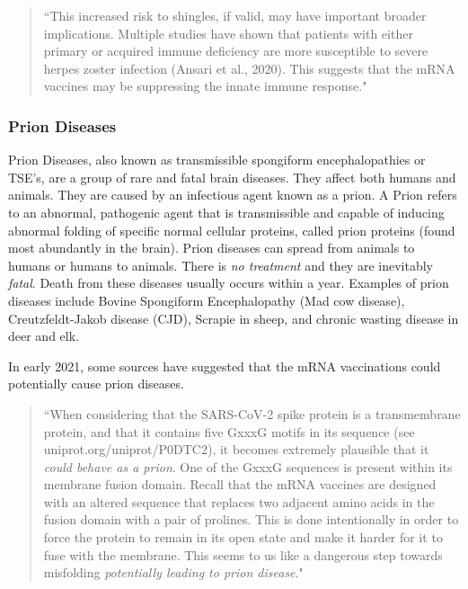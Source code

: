 \documentclass[10pt, a4paper, twocolumn]{book}
\begin{document}
\begin{quotation}
	``This increased risk to shingles, if valid, may have important broader implications. Multiple studies
	have shown that patients with either primary or acquired immune deficiency are more susceptible to
	severe herpes zoster infection (Ansari et al., 2020). This suggests that the mRNA vaccines may be
	suppressing the innate immune response." \citep{WorseThanTheDisease}
\end{quotation}







\subsubsection{Prion Diseases}

Prion Diseases, also known as transmissible spongiform encephalopathies or TSE's, are a group of rare and fatal brain diseases. They affect both humans and animals. They are caused by an infectious agent known as a prion. A Prion refers to an abnormal, pathogenic agent that is transmissible and capable of inducing abnormal folding of specific normal cellular proteins, called prion proteins (found most abundantly in the brain). Prion diseases can spread from animals to humans or humans to animals. There is \textit{no treatment} and they are inevitably \textit{fatal}. Death from these diseases usually occurs within a year. Examples of prion diseases include Bovine Spongiform Encephalopathy (Mad cow disease), Creutzfeldt-Jakob disease (CJD), Scrapie in sheep, and chronic wasting disease in deer and elk.

In early 2021, some sources have suggested that the mRNA vaccinations could potentially cause prion diseases. 

\begin{quotation}
	``When considering that the SARS-CoV-2 spike protein is a transmembrane protein, and that it
	contains five GxxxG motifs in its sequence (see uniprot.org/uniprot/P0DTC2), it becomes
	extremely plausible that it \textit{could behave as a prion}. One of the GxxxG sequences is present within
	its membrane fusion domain. Recall that the mRNA vaccines are designed with an altered sequence
	that replaces two adjacent amino acids in the fusion domain with a pair of prolines. This is done
	intentionally in order to force the protein to remain in its open state and make it harder for it to fuse
	with the membrane. This seems to us like a dangerous step towards misfolding \textit{potentially leading to prion disease}." \citep{WorseThanTheDisease}
\end{quotation}
\end{document}
